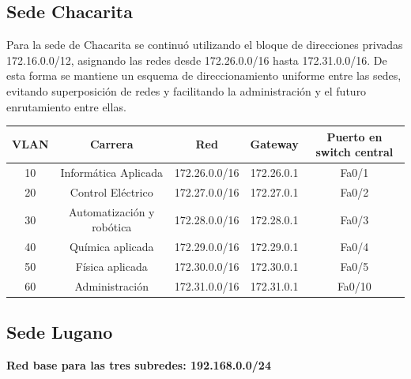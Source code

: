 \documentclass[a4paper,16pt]{article}
\begin{document}
	\vspace{1cm}	
	\subsection*{Sede Chacarita}
	Para la sede de Chacarita se continuó utilizando el bloque de direcciones privadas 172.16.0.0/12, asignando las redes desde 172.26.0.0/16 hasta 172.31.0.0/16. De esta forma se mantiene un esquema de direccionamiento uniforme entre las sedes, evitando superposición de redes y facilitando la administración y el futuro enrutamiento entre ellas.
	
	\vspace{1cm}
	
	\begin{tabular}{c|c|c|c|c}
		\textbf{VLAN} & \textbf{Carrera} & \textbf{Red} & \textbf{Gateway} & \textbf{Puerto en switch central}\\
		\hline
		10 & Informática Aplicada & 172.26.0.0/16 & 172.26.0.1 & Fa0/1\\
		20 & Control Eléctrico & 172.27.0.0/16 & 172.27.0.1 & Fa0/2\\
		30 & Automatización y robótica & 172.28.0.0/16 & 172.28.0.1 & Fa0/3\\
		40 & Química aplicada & 172.29.0.0/16 & 172.29.0.1 & Fa0/4\\
		50 & Física aplicada & 172.30.0.0/16 & 172.30.0.1 & Fa0/5\\
		60 & Administración & 172.31.0.0/16 & 172.31.0.1 & Fa0/10\\
	\end{tabular}


\vspace{1cm}	
\subsection*{Sede Lugano}

\textbf{Red base para las tres subredes: 192.168.0.0/24}\\
\end{document}

